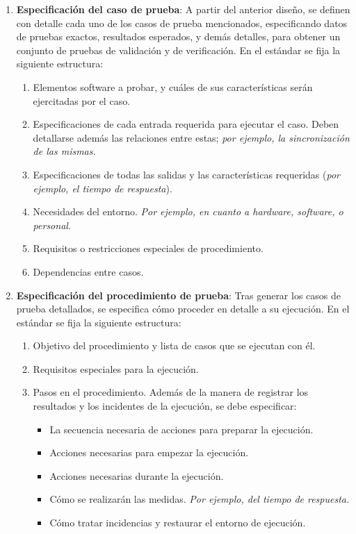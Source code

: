 \begin{enumerate}
    \item \textbf{Especificación del caso de prueba}: A partir del anterior diseño, se definen con detalle cada uno de los casos de prueba mencionados, especificando datos de pruebas exactos, resultados esperados, y demás detalles, para obtener un conjunto de pruebas de validación y de verificación. En el estándar se fija la siguiente estructura:
    \begin{enumerate}
        \item Elementos software a probar, y cuáles de sus características serán ejercitadas por el caso.
        \item Especificaciones de cada entrada requerida para ejecutar el caso. Deben detallarse además las relaciones entre estas; \textit{por ejemplo, la sincronización de las mismas.}
        \item Especificaciones de todas las salidas y las características requeridas (\textit{por ejemplo, el tiempo de respuesta}).
        \item Necesidades del entorno. \textit{Por ejemplo, en cuanto a hardware, software, o personal}.
        \item Requisitos o restricciones especiales de procedimiento.
        \item Dependencias entre casos.
    \end{enumerate}

    \item \textbf{Especificación del procedimiento de prueba}: Tras generar los casos de prueba detallados, se especifica cómo proceder en detalle a su ejecución. En el estándar se fija la siguiente estructura:
    \begin{enumerate}
        \item Objetivo del procedimiento y lista de casos que se ejecutan con él.
        \item Requisitos especiales para la ejecución.
        \item Pasos en el procedimiento. Además de la manera de registrar los resultados y los incidentes de la ejecución, se debe especificar:
        \begin{itemize}
            \item La secuencia necesaria de acciones para preparar la ejecución.
            \item Acciones necesarias para empezar la ejecución.
            \item Acciones necesarias durante la ejecución.
            \item Cómo se realizarán las medidas. \textit{Por ejemplo, del tiempo de respuesta.}
            \item Cómo tratar incidencias y restaurar el entorno de ejecución.
        \end{itemize}
    \end{enumerate}
\end{enumerate}


